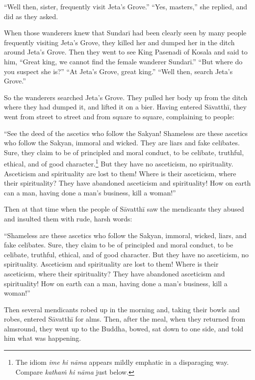 \documentclass[12pt,openany]{book}%
\begin{document}
“Well then, sister, frequently visit Jeta’s Grove.” “Yes, masters,” she replied, and did as they asked. 

When those wanderers knew that \textsanskrit{Sundarī} had been clearly seen by many people frequently visiting Jeta’s Grove, they killed her and dumped her in the ditch around Jeta’s Grove. Then they went to see King Pasenadi of Kosala and said to him, “Great king, we cannot find the female wanderer \textsanskrit{Sundarī}.” “But where do you suspect she is?” “At Jeta’s Grove, great king.” “Well then, search Jeta’s Grove.” 

So the wanderers searched Jeta’s Grove. They pulled her body up from the ditch where they had dumped it, and lifted it on a bier. Having entered \textsanskrit{Sāvatthī}, they went from street to street and from square to square, complaining to people: 

“See the deed of the ascetics who follow the Sakyan! Shameless are these ascetics who follow the Sakyan, immoral and wicked. They are liars and fake celibates. Sure, they claim to be of principled and moral conduct, to be celibate, truthful, ethical, and of good character.\footnote{The idiom \textit{ime hi \textsanskrit{nāma}} appears mildly emphatic in a disparaging way. Compare \textit{\textsanskrit{kathaṁ} hi \textsanskrit{nāma}} just below. } But they have no asceticism, no spirituality. Asceticism and spirituality are lost to them! Where is their asceticism, where their spirituality? They have abandoned asceticism and spirituality! How on earth can a man, having done a man’s business, kill a woman!” 

Then at that time when the people of \textsanskrit{Sāvatthī} saw the mendicants they abused and insulted them with rude, harsh words: 

“Shameless are these ascetics who follow the Sakyan, immoral, wicked, liars, and fake celibates. Sure, they claim to be of principled and moral conduct, to be celibate, truthful, ethical, and of good character. But they have no asceticism, no spirituality. Asceticism and spirituality are lost to them! Where is their asceticism, where their spirituality? They have abandoned asceticism and spirituality! How on earth can a man, having done a man’s business, kill a woman!” 

Then several mendicants robed up in the morning and, taking their bowls and robes, entered \textsanskrit{Sāvatthī} for alms. Then, after the meal, when they returned from almsround, they went up to the Buddha, bowed, sat down to one side, and told him what was happening. 
\end{document}
